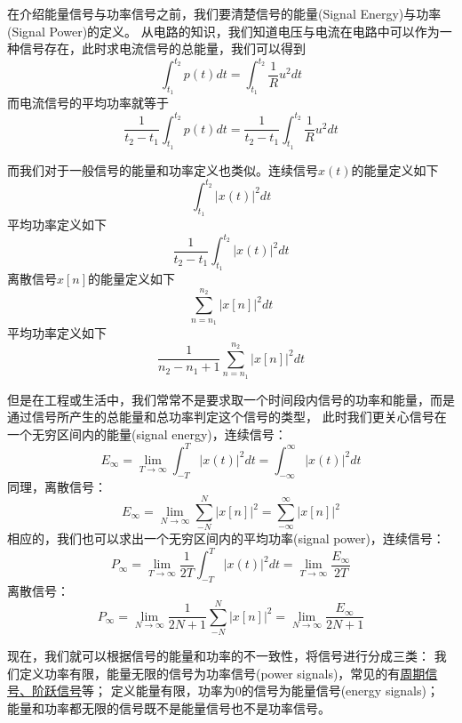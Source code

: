 \documentclass[UTF8]{article}
\begin{document}
\begin{enumerate}
    在介绍能量信号与功率信号之前，我们要清楚信号的能量(Signal Energy)与功率(Signal Power)的定义。
    从电路的知识，我们知道电压与电流在电路中可以作为一种信号存在，此时求电流信号的总能量，我们可以得到
    $$\int_{t_{1}}^{t_{2}}p(t)dt=\int_{t_{1}}^{t_{2}}\frac{1}{R}u^{2}dt$$
    而电流信号的平均功率就等于
    $$\frac{1}{t_{2}-t_{1}}\int_{t_{1}}^{t_{2}}p(t)dt=\frac{1}{t_{2}-t_{1}}\int_{t_{1}}^{t_{2}}\frac{1}{R}u^{2}dt$$

    而我们对于一般信号的能量和功率定义也类似。连续信号$x(t)$的能量定义如下
    $$\int_{t_{1}}^{t_{2}}\left | x(t) \right |^{2} dt$$
    平均功率定义如下
    $$\frac{1}{t_{2}-t_{1}}\int_{t_{1}}^{t_{2}}\left | x(t) \right |^{2} dt$$
    离散信号$x[n]$的能量定义如下
    $$\sum_{n=n_{1}}^{n_{2}}\left | x[n] \right |^{2} dt$$
    平均功率定义如下
    $$\frac{1}{n_{2}-n_{1}+1}\sum_{n=n_{1}}^{n_{2}}\left | x[n] \right |^{2} dt$$
    
    但是在工程或生活中，我们常常不是要求取一个时间段内信号的功率和能量，而是通过信号所产生的总能量和总功率判定这个信号的类型，
    此时我们更关心信号在一个无穷区间内的能量(signal energy)，连续信号：
    \begin{equation}
        E_{\infty }=\lim_{T \to \infty}\int_{-T}^{T}\left | x(t) \right |^{2} dt=\int_{-\infty}^{\infty}\left | x(t) \right |^{2} dt
    \end{equation}
    同理，离散信号：
    \begin{equation}
        E_{\infty }=\lim_{N \to \infty}\sum_{-N}^{N}\left | x[n] \right |^{2}=\sum_{-\infty}^{\infty}\left | x[n] \right |^{2}
    \end{equation}
    相应的，我们也可以求出一个无穷区间内的平均功率(signal power)，连续信号：
    \begin{equation}
        P_{\infty }=\lim_{T \to \infty}\frac{1}{2T}\int_{-T}^{T}\left | x(t) \right |^{2} dt=\lim_{T \to \infty}\frac{E_{\infty}}{2T}
    \end{equation}
    离散信号：
    \begin{equation}
        P_{\infty }=\lim_{N \to \infty}\frac{1}{2N+1}\sum_{-N}^{N}\left | x[n] \right |^{2}=\lim_{N \to \infty}\frac{E_{\infty}}{2N+1}
    \end{equation}

    现在，我们就可以根据信号的能量和功率的不一致性，将信号进行分成三类：
    我们定义功率有限，能量无限的信号为{\heiti 功率信号(power signals)}，常见的有\underline{周期信号、阶跃信号}等；
    定义能量有限，功率为0的信号为{\heiti 能量信号(energy signals)}；
    能量和功率都无限的信号既不是能量信号也不是功率信号。

\end{enumerate}
\end{document}
